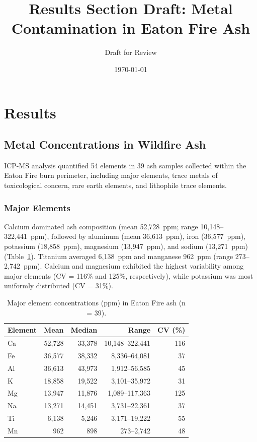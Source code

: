 \documentclass[12pt,letterpaper]{article}
\title{Results Section Draft: Metal Contamination in Eaton Fire Ash}
\author{Draft for Review}
\date{\today}
\begin{document}
\maketitle

\section{Results}

\subsection{Metal Concentrations in Wildfire Ash}

ICP-MS analysis quantified 54 elements in 39 ash samples collected within the Eaton Fire burn perimeter, including major elements, trace metals of toxicological concern, rare earth elements, and lithophile trace elements.

\subsubsection{Major Elements}

Calcium dominated ash composition (mean 52,728~ppm; range 10,148--322,441~ppm), followed by aluminum (mean 36,613~ppm), iron (36,577~ppm), potassium (18,858~ppm), magnesium (13,947~ppm), and sodium (13,271~ppm) (Table~\ref{tab:major_elements}). Titanium averaged 6,138~ppm and manganese 962~ppm (range 273--2,742~ppm). Calcium and magnesium exhibited the highest variability among major elements (CV = 116\% and 125\%, respectively), while potassium was most uniformly distributed (CV = 31\%).

\begin{table}[htbp]
\centering
\caption{Major element concentrations (ppm) in Eaton Fire ash (n = 39).}
\label{tab:major_elements}
\begin{tabular}{lrrrr}
\toprule
Element & Mean & Median & Range & CV (\%) \\
\midrule
Ca & 52,728 & 33,378 & 10,148--322,441 & 116 \\
Fe & 36,577 & 38,332 & 8,336--64,081 & 37 \\
Al & 36,613 & 43,973 & 1,912--56,585 & 45 \\
K & 18,858 & 19,522 & 3,101--35,972 & 31 \\
Mg & 13,947 & 11,876 & 1,089--117,363 & 125 \\
Na & 13,271 & 14,451 & 3,731--22,361 & 37 \\
Ti & 6,138 & 5,246 & 3,171--19,222 & 55 \\
Mn & 962 & 898 & 273--2,742 & 48 \\
\bottomrule
\end{tabular}
\end{table}
\end{document}
